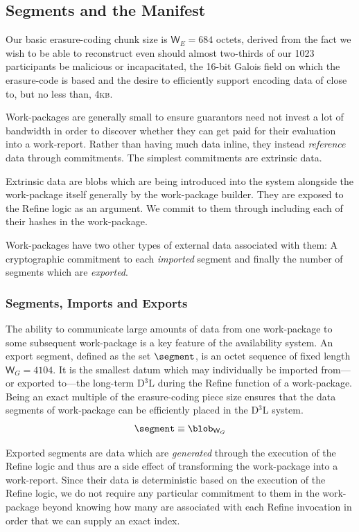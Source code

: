 \subsection{Segments and the Manifest}

Our basic erasure-coding chunk size is $\mathsf{W}_E = 684$ octets, derived from the fact we wish to be able to reconstruct even should almost two-thirds of our 1023 participants be malicious or incapacitated, the 16-bit Galois field on which the erasure-code is based and the desire to efficiently support encoding data of close to, but no less than, 4\textsc{kb}.

Work-packages are generally small to ensure guarantors need not invest a lot of bandwidth in order to discover whether they can get paid for their evaluation into a work-report. Rather than having much data inline, they instead \emph{reference} data through commitments. The simplest commitments are extrinsic data.

Extrinsic data are blobs which are being introduced into the system alongside the work-package itself generally by the work-package builder. They are exposed to the Refine logic as an argument. We commit to them through including each of their hashes in the work-package.

Work-packages have two other types of external data associated with them: A cryptographic commitment to each \emph{imported} segment and finally the number of segments which are \emph{exported}.

\subsubsection{Segments, Imports and Exports}

The ability to communicate large amounts of data from one work-package to some subsequent work-package is a key feature of the \Jam availability system. An export segment, defined as the set $\segment$, is an octet sequence of fixed length $\mathsf{W}_G = 4104$. It is the smallest datum which may individually be imported from---or exported to---the long-term D$^3$L during the Refine function of a work-package. Being an exact multiple of the erasure-coding piece size ensures that the data segments of work-package can be efficiently placed in the D$^3$L system.
\begin{equation}\label{eq:segment}
  \segment \equiv \blob_{\mathsf{W}_G}
\end{equation}

Exported segments are data which are \emph{generated} through the execution of the Refine logic and thus are a side effect of transforming the work-package into a work-report. Since their data is deterministic based on the execution of the Refine logic, we do not require any particular commitment to them in the work-package beyond knowing how many are associated with each Refine invocation in order that we can supply an exact index.

